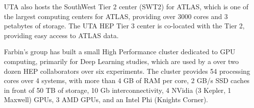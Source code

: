 UTA also hosts the SouthWest Tier 2 center (SWT2) for ATLAS, which is one of the largest computing centers for ATLAS, providing over 3000 cores and 3 petabytes of storage. The UTA HEP Tier 3 center is co-located with the Tier 2, providing easy access to ATLAS data.

Farbin's group has built a small High Performance cluster dedicated to
GPU computing, primarily for Deep Learning studies, which are used by
a over two dozen HEP collaborators over six experiments. The cluster
provides 54 processing cores over 4 systems, with more than 4 GB of
RAM per core, 2 GB/s SSD caches in front of 50 TB of storage, 10 Gb
interconnectivity, 4 NVidia (3 Kepler, 1 Maxwell) GPUs, 3 AMD GPUs,
and an Intel Phi (Knights Corner).
